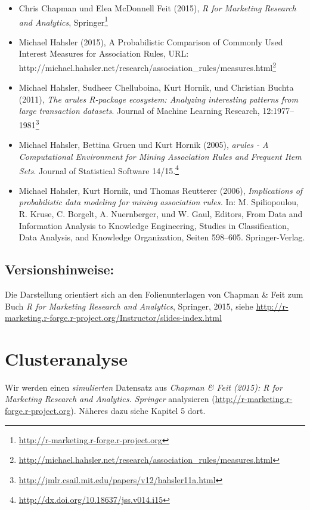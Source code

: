 \documentclass[12pt,]{book}
\providecommand{\tightlist}{%
  \setlength{\itemsep}{0pt}\setlength{\parskip}{0pt}}
\renewcommand{\href}[2]{#2\footnote{\url{#1}}}
\begin{document}
\begin{itemize}
\tightlist
\item
  \href{http://r-marketing.r-forge.r-project.org}{Chris Chapman und Elea
  McDonnell Feit (2015), \emph{R for Marketing Research and Analytics},
  Springer}
\item
  \href{http://michael.hahsler.net/research/association_rules/measures.html}{Michael
  Hahsler (2015), A Probabilistic Comparison of Commonly Used Interest
  Measures for Association Rules, URL:
  http://michael.hahsler.net/research/association\_rules/measures.html}
\item
  \href{http://jmlr.csail.mit.edu/papers/v12/hahsler11a.html}{Michael
  Hahsler, Sudheer Chelluboina, Kurt Hornik, und Christian Buchta
  (2011), \emph{The arules R-package ecosystem: Analyzing interesting
  patterns from large transaction datasets}. Journal of Machine Learning
  Research, 12:1977--1981}
\item
  \href{http://dx.doi.org/10.18637/jss.v014.i15}{Michael Hahsler,
  Bettina Gruen und Kurt Hornik (2005), \emph{arules - A Computational
  Environment for Mining Association Rules and Frequent Item Sets}.
  Journal of Statistical Software 14/15.}
\item
  Michael Hahsler, Kurt Hornik, und Thomas Reutterer (2006),
  \emph{Implications of probabilistic data modeling for mining
  association rules.} In: M. Spiliopoulou, R. Kruse, C. Borgelt, A.
  Nuernberger, und W. Gaul, Editors, From Data and Information Analysis
  to Knowledge Engineering, Studies in Classification, Data Analysis,
  and Knowledge Organization, Seiten 598--605. Springer-Verlag.
\end{itemize}

\section{Versionshinweise:}\label{versionshinweise-1}

Die Darstellung orientiert sich an den Folienunterlagen von Chapman \&
Feit zum Buch \emph{R for Marketing Research and Analytics}, Springer,
2015, siehe
\url{http://r-marketing.r-forge.r-project.org/Instructor/slides-index.html}

\chapter{Clusteranalyse}\label{clusteranalyse}

Wir werden einen \emph{simulierten} Datensatz aus \emph{Chapman \& Feit
(2015): R for Marketing Research and Analytics. Springer} analysieren
(\url{http://r-marketing.r-forge.r-project.org}). Näheres dazu siehe
Kapitel 5 dort.
\end{document}
